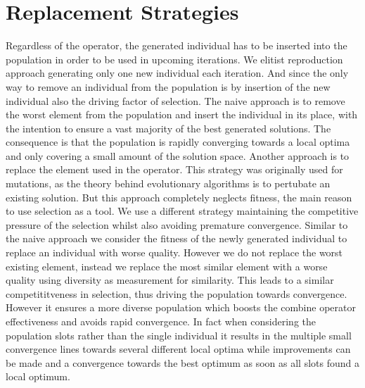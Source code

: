 \documentclass[a4paper,12pt,bibtotoc,titlepage, liststotoc,BCOR7mm,headsepline,pointlessnumbers]{scrbook}
\numberwithin{equation}{section}
\begin{document}
\section{Replacement Strategies}
\label{sec:replacement}
Regardless of the operator, the generated individual has to be inserted into the population in order to be used in upcoming iterations. We elitist reproduction approach generating only one new individual each iteration. And since the only way to remove an individual from the population is by insertion of the new individual also the driving factor of selection. 
The naive approach is to remove the worst element from the population and insert the individual in its place, with the intention to ensure a vast majority of the best generated solutions.
The consequence is that the population is rapidly converging towards a local optima and only covering a small amount of the solution space. Another approach is to replace the element used in the operator. This strategy was originally used for mutations, as the theory behind evolutionary algorithms is to pertubate an existing solution. But this approach completely neglects fitness, the main reason to use selection as a tool. 
We use a different strategy maintaining the competitive pressure of the selection whilst also avoiding premature convergence. Similar to the naive approach we consider the fitness of the newly generated individual to replace an individual with worse quality. However we do not replace the worst existing element, instead we replace the most similar element with a worse quality using diversity as measurement for similarity. This leads to a similar competititveness in selection, thus driving the population towards convergence. However it ensures a more diverse population 
which boosts the combine operator effectiveness and avoids rapid convergence. In fact when considering the population slots rather than the single individual it results in the multiple small convergence lines towards several different local optima while improvements can be made and a convergence towards the best optimum as soon as all slots found a local optimum. 
\end{document}
